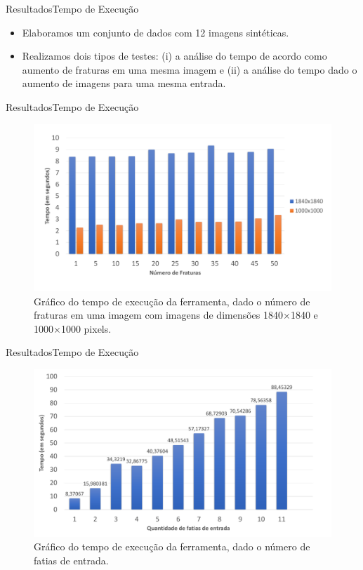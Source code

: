 \documentclass{beamer}
\begin{document}
\begin{frame}{Resultados}{Tempo de Execução}
    \begin{itemize}
        \item Elaboramos um conjunto de dados com 12 imagens sintéticas.
        \item Realizamos dois tipos de testes: (i) a análise do tempo de acordo como aumento de fraturas em uma mesma imagem e (ii) a análise do tempo dado o aumento de imagens para uma mesma entrada.
    \end{itemize}
    
\end{frame}


\begin{frame}{Resultados}{Tempo de Execução}
    \begin{figure}[!htb]
    \centering
    \includegraphics[width=1.\textwidth]{fig/tempo-fraturas.pdf} \\
    \scriptsize{Gráfico do tempo de execução da ferramenta, dado o número de fraturas em uma imagem com imagens de dimensões 1840$\times$1840 e 1000$\times$1000 pixels.}
    \label{fig:graf-tempop1}
    \end{figure}
\end{frame}

\begin{frame}{Resultados}{Tempo de Execução}
        
    \begin{figure}[!htb]
    \centering
    \includegraphics[width=.9\textwidth]{fig/grafico-tempo.pdf}\\
    \scriptsize{Gráfico do tempo de execução da ferramenta, dado o número de fatias de entrada.}
    \end{figure}

\end{frame}
\end{document}
